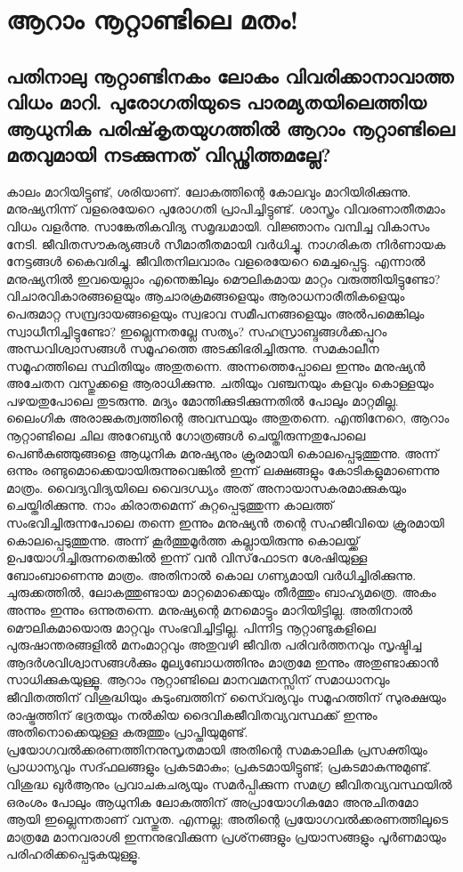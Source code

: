 \chapter{ആറാം നൂറ്റാണ്ടിലെ മതം! }
  \section{പതിനാലു നൂറ്റാണ്ടിനകം ലോകം വിവരിക്കാനാവാത്ത വിധം മാറി. പുരോഗതിയുടെ പാരമ്യതയിലെത്തിയ ആധുനിക പരിഷ്‌കൃതയുഗത്തില്‍ ആറാം നൂറ്റാണ്ടിലെ മതവുമായി നടക്കുന്നത് വിഡ്ഢിത്തമല്ലേ?}
   
 കാലം മാറിയിട്ടുണ്ട്, ശരിയാണ്. ലോകത്തിന്റെ കോലവും മാറിയിരിക്കുന്നു. മനുഷ്യനിന്ന് വളരെയേറെ പുരോഗതി പ്രാപിച്ചിട്ടുണ്ട്. ശാസ്ത്രം വിവരണാതീതമാം വിധം വളര്‍ന്നു. സാങ്കേതികവിദ്യ സമൃദ്ധമായി. വിജ്ഞാനം വമ്പിച്ച വികാസം നേടി. ജീവിതസൗകര്യങ്ങള്‍ സീമാതീതമായി വര്‍ധിച്ചു. നാഗരികത നിര്‍ണായക നേട്ടങ്ങള്‍ കൈവരിച്ചു. ജീവിതനിലവാരം വളരെയേറെ മെച്ചപ്പെട്ടു. എന്നാല്‍ മനുഷ്യനില്‍ ഇവയെല്ലാം എന്തെങ്കിലും മൌലികമായ മാറ്റം വരുത്തിയിട്ടുണ്ടോ? വിചാരവികാരങ്ങളെയും ആചാരക്രമങ്ങളെയും ആരാധനാരീതികളെയും പെരുമാറ്റ സമ്പ്രദായങ്ങളെയും സ്വഭാവ സമീപനങ്ങളെയും അല്‍പമെങ്കിലും സ്വാധീനിച്ചിട്ടുണ്ടോ? ഇല്ലെന്നതല്ലേ സത്യം? സഹസ്രാബ്ദങ്ങള്‍ക്കപ്പുറം അന്ധവിശ്വാസങ്ങള്‍ സമൂഹത്തെ അടക്കിഭരിച്ചിരുന്നു. സമകാലീന സമൂഹത്തിലെ സ്ഥിതിയും അതുതന്നെ. അന്നത്തെപ്പോലെ ഇന്നും മനുഷ്യന്‍ അചേതന വസ്തുക്കളെ ആരാധിക്കുന്നു. ചതിയും വഞ്ചനയും കളവും കൊള്ളയും പഴയതുപോലെ തുടരുന്നു. മദ്യം മോന്തിക്കുടിക്കുന്നതില്‍ പോലും മാറ്റമില്ല. ലൈംഗിക അരാജകത്വത്തിന്റെ അവസ്ഥയും അതുതന്നെ. എന്തിനേറെ, ആറാം നൂറ്റാണ്ടിലെ ചില അറേബ്യന്‍ ഗോത്രങ്ങള്‍ ചെയ്തിരുന്നതുപോലെ പെണ്‍കുഞ്ഞുങ്ങളെ ആധുനിക മനുഷ്യനും ക്രൂരമായി കൊലപ്പെടുത്തുന്നു. അന്ന് ഒന്നും രണ്ടുമൊക്കെയായിരുന്നുവെങ്കില്‍ ഇന്ന് ലക്ഷങ്ങളും കോടികളുമാണെന്നു മാത്രം. വൈദ്യവിദ്യയിലെ വൈദഗ്ധ്യം അത് അനായാസകരമാക്കുകയും ചെയ്തിരിക്കുന്നു. നാം കിരാതമെന്ന് കുറ്റപ്പെടുത്തുന്ന കാലത്ത് സംഭവിച്ചിരുന്നപോലെ തന്നെ ഇന്നും മനുഷ്യന്‍ തന്റെ സഹജീവിയെ ക്രൂരമായി കൊലപ്പെടുത്തുന്നു. അന്ന് കൂര്‍ത്തുമൂര്‍ത്ത കല്ലായിരുന്നു കൊലയ്ക്ക് ഉപയോഗിച്ചിരുന്നതെങ്കില്‍ ഇന്ന് വന്‍ വിസ്‌ഫോടന ശേഷിയുള്ള ബോംബാണെന്നു മാത്രം. അതിനാല്‍ കൊല ഗണ്യമായി വര്‍ധിച്ചിരിക്കുന്നു. ചുരുക്കത്തില്‍, ലോകത്തുണ്ടായ മാറ്റമൊക്കെയും തീര്‍ത്തും ബാഹ്യമത്രെ. അകം അന്നും ഇന്നും ഒന്നുതന്നെ. മനുഷ്യന്റെ മനമൊട്ടും മാറിയിട്ടില്ല. അതിനാല്‍ മൌലികമായൊരു മാറ്റവും സംഭവിച്ചിട്ടില്ല. പിന്നിട്ട നൂറ്റാണ്ടുകളിലെ പുരുഷാന്തരങ്ങളില്‍ മനംമാറ്റവും അതുവഴി ജീവിത പരിവര്‍ത്തനവും സൃഷ്ടിച്ച ആദര്‍ശവിശ്വാസങ്ങള്‍ക്കും മൂല്യബോധത്തിനും മാത്രമേ ഇന്നും അതുണ്ടാക്കാന്‍ സാധിക്കുകയുള്ളൂ. ആറാം നൂറ്റാണ്ടിലെ മാനവമനസ്സിന് സമാധാനവും ജീവിതത്തിന് വിശുദ്ധിയും കുടുംബത്തിന് സൈ്വര്യവും സമൂഹത്തിന് സുരക്ഷയും രാഷ്ട്രത്തിന് ഭദ്രതയും നല്‍കിയ ദൈവികജീവിതവ്യവസ്ഥക്ക് ഇന്നും അതിനൊക്കെയുള്ള കരുത്തും പ്രാപ്തിയുമുണ്ട്. പ്രയോഗവല്‍ക്കരണത്തിനനുസൃതമായി അതിന്റെ സമകാലിക പ്രസക്തിയും പ്രാധാന്യവും സദ്ഫലങ്ങളും പ്രകടമാകും; പ്രകടമായിട്ടുണ്ട്; പ്രകടമാകുന്നുമുണ്ട്. വിശുദ്ധ ഖുര്‍ആനും പ്രവാചകചര്യയും സമര്‍പ്പിക്കുന്ന സമഗ്ര ജീവിതവ്യവസ്ഥയില്‍ ഒരംശം പോലും ആധുനിക ലോകത്തിന് അപ്രായോഗികമോ അനുചിതമോ ആയി ഇല്ലെന്നതാണ് വസ്തുത. എന്നല്ല; അതിന്റെ പ്രയോഗവല്‍ക്കരണത്തിലൂടെ മാത്രമേ മാനവരാശി ഇന്നനുഭവിക്കുന്ന പ്രശ്‌നങ്ങളും പ്രയാസങ്ങളും പൂര്‍ണമായും പരിഹരിക്കപ്പെടുകയുള്ളൂ.
